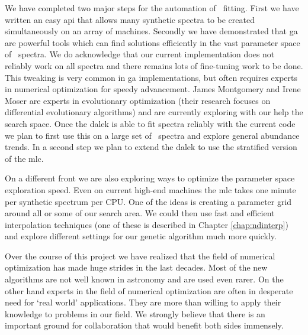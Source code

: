 We have completed two major steps for the automation of \sneia\ fitting. First we have written an easy \gls{api} that allows many synthetic spectra to be created simultaneously on an array of machines. Secondly we have demonstrated that \gls{ga} are powerful tools which can find solutions efficiently in the vast parameter space of \sneia\ spectra. We do acknowledge that our current implementation does not reliably work on all spectra and there remains lots of fine-tuning work to be done. This tweaking is very common in \gls{ga} implementations, but often requires experts in numerical optimization for speedy advancement. James Montgomery and Irene Moser are experts in evolutionary optimization (their research focuses on differential evolutionary algorithms) and are currently exploring with our help the search space. Once the \gls{dalek} is able to fit spectra reliably with the current code we plan to first use this on a large set of \sneia\ spectra and explore general abundance trends. In a second step we plan to extend the \gls{dalek} to use the stratified version of the \gls{mlc}.

On a different front we are also exploring ways to optimize the parameter space exploration speed. Even on current high-end machines the \gls{mlc} takes one minute per synthetic spectrum per CPU. One of the ideas is creating a parameter grid around all or some of our search area. We could then use fast and efficient interpolation techniques (one of these is described in Chapter \ref{chap:ndinterp}) and explore different settings for our genetic algorithm much more quickly.

Over the course of this project we have realized that the field of numerical optimization has made huge strides in the last decades. Most of the new algorithms are not well known in astronomy and are used even rarer. On the other hand experts in the field of numerical optimization are often in desperate need for `real world' applications. They are more than willing to apply their knowledge to problems in our field. We strongly believe that there is an important ground for collaboration that would benefit both sides immensely.





